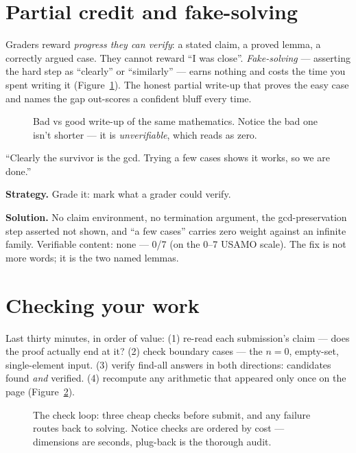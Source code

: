 \section{Partial credit and fake-solving}
Graders reward \emph{progress they can verify}: a stated claim, a
proved lemma, a correctly argued case. They cannot reward ``I was
close''. \emph{Fake-solving} --- asserting the hard step as ``clearly''
or ``similarly'' --- earns nothing and costs the time you spent
writing it (Figure~\ref{fig:sidebyside}). The honest partial write-up
that proves the easy case and names the gap out-scores a confident
bluff every time.
\begin{figure}[ht]\centering

\caption{Bad vs good write-up of the same mathematics. Notice the bad
one isn't shorter --- it is \emph{unverifiable}, which reads as zero.}
\label{fig:sidebyside}
\end{figure}
\begin{example}
``Clearly the survivor is the gcd. Trying a few cases shows it works,
so we are done.''

\textbf{Strategy.} Grade it: mark what a grader could verify.

\textbf{Solution.} No claim environment, no termination argument, the
gcd-preservation step asserted not shown, and ``a few cases'' carries
zero weight against an infinite family. Verifiable content: none ---
0/7 (on the 0--7 USAMO scale). The fix is not more words; it is the two named lemmas.
\end{example}

\section{Checking your work}
Last thirty minutes, in order of value: (1) re-read each submission's
claim --- does the proof actually end at it? (2) check boundary cases
--- the $n=0$, empty-set, single-element input. (3) verify find-all
answers in both directions: candidates found \emph{and} verified.
(4) recompute any arithmetic that appeared only once on the page
(Figure~\ref{fig:checkloop}).

\begin{figure}[ht]\centering

\caption{The check loop: three cheap checks before submit, and any
failure routes back to solving. Notice checks are ordered by cost ---
dimensions are seconds, plug-back is the thorough audit.}
\label{fig:checkloop}
\end{figure}

